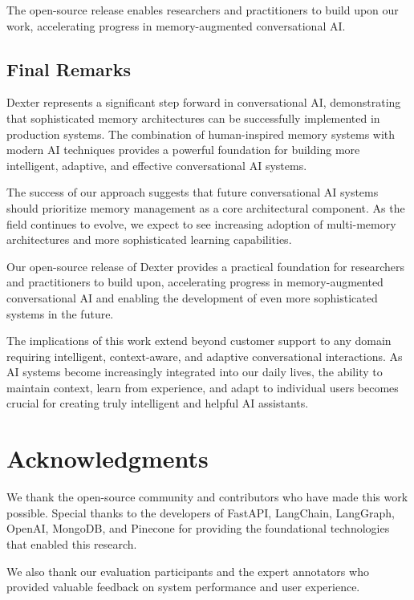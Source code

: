 \documentclass[11pt]{article}
\begin{document}
The open-source release enables researchers and practitioners to build upon our work, accelerating progress in memory-augmented conversational AI.

\subsection{Final Remarks}

Dexter represents a significant step forward in conversational AI, demonstrating that sophisticated memory architectures can be successfully implemented in production systems. The combination of human-inspired memory systems with modern AI techniques provides a powerful foundation for building more intelligent, adaptive, and effective conversational AI systems.

The success of our approach suggests that future conversational AI systems should prioritize memory management as a core architectural component. As the field continues to evolve, we expect to see increasing adoption of multi-memory architectures and more sophisticated learning capabilities.

Our open-source release of Dexter provides a practical foundation for researchers and practitioners to build upon, accelerating progress in memory-augmented conversational AI and enabling the development of even more sophisticated systems in the future.

The implications of this work extend beyond customer support to any domain requiring intelligent, context-aware, and adaptive conversational interactions. As AI systems become increasingly integrated into our daily lives, the ability to maintain context, learn from experience, and adapt to individual users becomes crucial for creating truly intelligent and helpful AI assistants.

\section*{Acknowledgments}

We thank the open-source community and contributors who have made this work possible. Special thanks to the developers of FastAPI, LangChain, LangGraph, OpenAI, MongoDB, and Pinecone for providing the foundational technologies that enabled this research.

We also thank our evaluation participants and the expert annotators who provided valuable feedback on system performance and user experience.



\end{document}
